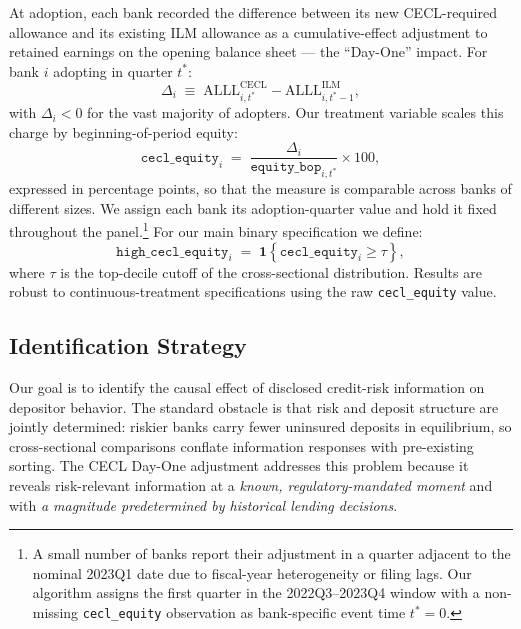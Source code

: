 At adoption, each bank recorded the difference between its new CECL-required
allowance and its existing ILM allowance as a cumulative-effect adjustment to
retained earnings on the opening balance sheet — the ``Day-One'' impact. For bank
$i$ adopting in quarter $t^{*}$:
\begin{equation}
  \Delta_i \;\equiv\;
  \mathrm{ALLL}^{\mathrm{CECL}}_{i,t^{*}} -
  \mathrm{ALLL}^{\mathrm{ILM}}_{i,t^{*}-1},
  \label{eq:dayone}
\end{equation}
with $\Delta_i < 0$ for the vast majority of adopters. Our treatment variable
scales this charge by beginning-of-period equity:
\begin{equation}
  \texttt{cecl\_equity}_{i}
  \;=\;
  \frac{\Delta_i}{\texttt{equity\_bop}_{i,t^{*}}}
  \times 100,
  \label{eq:treatment}
\end{equation}
expressed in percentage points, so that the measure is comparable across banks of
different sizes. We assign each bank its adoption-quarter value and hold it fixed
throughout the panel.\footnote{A small number of banks report their adjustment in
a quarter adjacent to the nominal 2023Q1 date due to fiscal-year heterogeneity
or filing lags. Our algorithm assigns the first quarter in the 2022Q3–2023Q4
window with a non-missing \texttt{cecl\_equity} observation as bank-specific
event time $t^{*}=0$.} For our main binary specification we define:
\begin{equation}
  \texttt{high\_cecl\_equity}_{i}
  \;=\;
  \mathbf{1}\!\left\{\texttt{cecl\_equity}_{i} \geq \tau\right\},
  \label{eq:binary}
\end{equation}
where $\tau$ is the top-decile cutoff of the cross-sectional distribution.
Results are robust to continuous-treatment specifications using the raw
\texttt{cecl\_equity} value.

\subsection{Identification Strategy}
\label{sec:background:id}

Our goal is to identify the causal effect of disclosed credit-risk information on
depositor behavior. The standard obstacle is that risk and deposit structure are
jointly determined: riskier banks carry fewer uninsured deposits in equilibrium,
so cross-sectional comparisons conflate information responses with pre-existing
sorting. The CECL Day-One adjustment addresses this problem because it reveals
risk-relevant information at a \textit{known, regulatory-mandated moment} and
with \textit{a magnitude predetermined by historical lending decisions}.


